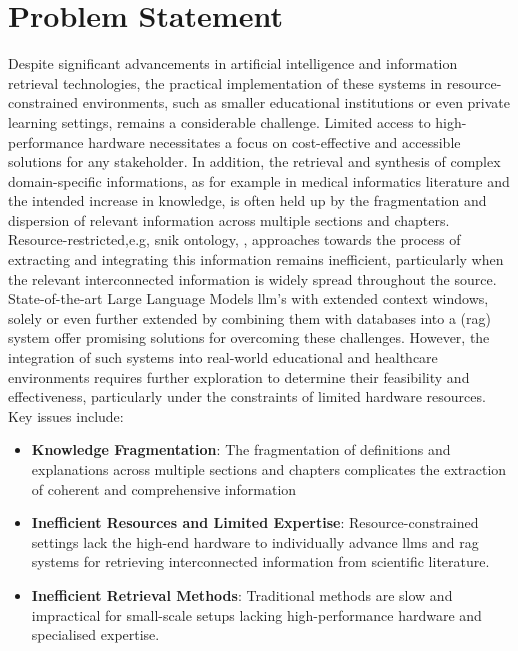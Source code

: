 \section{Problem Statement}\label{ch:problem statement}
Despite significant advancements in artificial intelligence and information retrieval technologies, the practical implementation of these systems in resource-constrained environments, such as smaller educational institutions or even private learning settings, remains a considerable challenge. 
Limited access to high-performance hardware necessitates a focus on cost-effective and accessible solutions for any stakeholder.
%
In addition, the retrieval and synthesis of complex domain-specific informations, as for example in medical informatics literature and the intended increase in knowledge, is often held up by the fragmentation and dispersion of relevant information across multiple sections and chapters. 
Resource-restricted,e.g, \ac{snik} ontology, \citet{Paul_Keller}, approaches towards the process of extracting and integrating this information remains inefficient, particularly when the relevant interconnected information is widely spread throughout the source.
%
State-of-the-art Large Language Models \ac{llm}'s with extended context windows, solely or even further extended by combining them with databases into a (\ac{rag}) system offer promising solutions for overcoming these challenges. 
However, the integration of such systems into real-world educational and healthcare environments requires further exploration to determine their feasibility and effectiveness, particularly under the constraints of limited hardware resources.
%
Key issues include:
\begin{itemize}
    \item \textbf{Knowledge Fragmentation}: 
    The fragmentation of definitions and explanations across multiple sections and chapters complicates the extraction of coherent and comprehensive information 
    \item \textbf{Inefficient Resources and Limited Expertise}: 
    Resource-constrained settings lack the high-end hardware  to individually advance \ac{llm}s and \ac{rag} systems for retrieving interconnected information from scientific literature.
    
    \item \textbf{Inefficient Retrieval Methods}: Traditional methods are slow and impractical for small-scale setups lacking high-performance hardware and specialised expertise.
\end{itemize}

